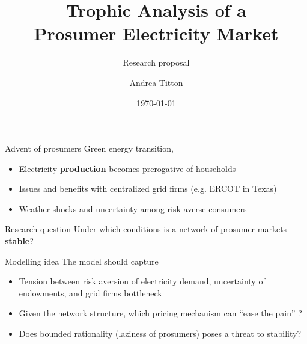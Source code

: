 \documentclass[xcolor={svgnames}]{beamer}
\title[Trophic analysis of Electricity markets]{Trophic Analysis of a\\ Prosumer Electricity Market}
\subtitle{Research proposal}
\author{Andrea Titton}
\institute{Tinbergen Institute}
\date{\today}
\begin{document}
\frame{\titlepage}

\begin{frame}{Advent of prosumers}
    Green energy transition,
    \begin{itemize}\setlength\itemsep{1em}
        \item Electricity \textbf{production} becomes prerogative of households
        \item Issues and benefits with centralized grid firms (e.g. ERCOT in Texas)
        \item Weather shocks and uncertainty among risk averse consumers
    \end{itemize}
\end{frame}

\begin{frame}{Research question}
    Under which conditions is a network of prosumer markets \textbf{stable}?

\end{frame}

\begin{frame}{Modelling idea}
    The model should capture
    \begin{itemize}\setlength\itemsep{1em}
        \item Tension between risk aversion of electricity demand, uncertainty of endowments, and grid firms bottleneck
        \item Given the network structure, which pricing mechanism can ``ease the pain'' ?
        \item Does bounded rationality (laziness of prosumers) poses a threat to stability?
    \end{itemize}
\end{frame}
\end{document}
